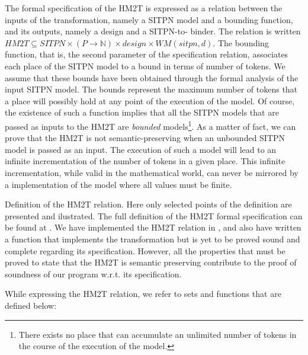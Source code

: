 The formal specification of the HM2T is expressed as a relation
between the inputs of the transformation, namely a SITPN model and a
bounding function, and its outputs, namely a \hvhdl{} design and a
SITPN-to-\hvhdl{} binder. The relation is written
$HM2T\subseteq{}SITPN\times(P\rightarrow\mathbb{N})\times{}design\times{}WM(sitpn,d)$.
The bounding function, that is, the second parameter of the
specification relation, associates each place of the SITPN model to a
bound in terms of number of tokens. We assume that these bounds have
been obtained through the formal analysis of the input SITPN model.
The bounds represent the maximum number of tokens that a place will
possibly hold at any point of the execution of the model. Of course,
the existence of such a function implies that all the SITPN models
that are passed as inputs to the HM2T are \textit{bounded}
models\footnote{There exists no place that can accumulate an unlimited
  number of tokens in the course of the execution of the model.}. As a
matter of fact, we can prove that the HM2T is not semantic-preserving
when an unbounded SITPN model is passed as an input. The execution of
such a model will lead to an infinite incrementation of the number of
tokens in a given place. This infinite incrementation, while valid in
the mathematical world, can never be mirrored by a \vhdl{}
implementation of the model where all values must be finite.

Definition of the HM2T relation. Here only selected points of the
definition are presented and ilustrated. The full definition of the
HM2T formal specification can be found at . We have implemented the HM2T
relation in \coq{}, and also have written a \coq{} function that
implements the transformation but is yet to be proved sound and
complete regarding its specification. %
However, all the properties that must be proved to state that the HM2T
is semantic preserving contribute to the proof of soundness of our
program w.r.t. its specification.

While expressing the HM2T relation, we refer to sets and functions
that are defined below:

